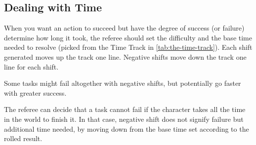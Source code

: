 \subsection{Dealing with Time}
\label{sec:dealing-with-time}

When you want an action to succeed but have the degree of success (or failure) determine how long it took, the referee should set the difficulty and the base time needed to resolve (picked from the Time Track in \autoref{tab:the-time-track}). Each shift generated moves up the track one line. Negative shifts move down the track one line for each shift.

Some tasks might fail altogether with negative shifts, but potentially go faster with greater success.

The referee can decide that a task cannot fail if the character takes all the time in the world to finish it. In that case, negative shift does not signify failure but additional time needed, by moving down from the base time set according to the rolled result.

